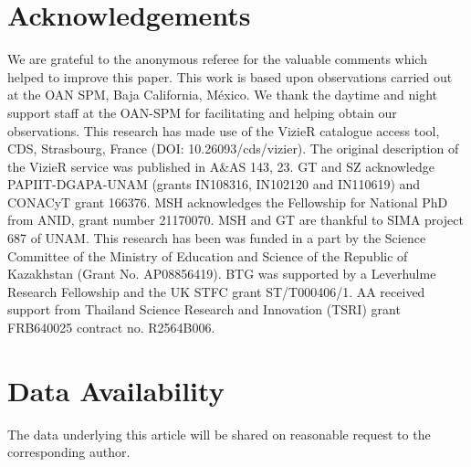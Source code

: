 \documentclass[fleqn,usenatbib]{mnras}
\begin{document}
\section*{Acknowledgements}

 We are grateful to the anonymous referee for the valuable comments which helped to improve this paper. This work is based upon observations carried out at the OAN SPM, Baja California, M\'{e}xico. We thank the daytime and night support staff at the OAN-SPM for facilitating and helping obtain our observations. This research has made use of the VizieR catalogue access tool, CDS, Strasbourg, France (DOI: 10.26093/cds/vizier). The original description of the VizieR service was published in A\&AS 143, 23.
GT and SZ acknowledge PAPIIT-DGAPA-UNAM (grants IN108316, IN102120 and IN110619) and CONACyT grant 166376.  MSH acknowledges the Fellowship for National PhD from ANID, grant number 21170070. MSH and GT are thankful to SIMA project 687 of UNAM.   This research has been was funded in a part by the Science Committee of the Ministry of Education and Science of the Republic of Kazakhstan (Grant No. AP08856419).
BTG was supported by a Leverhulme Research Fellowship and the UK STFC grant ST/T000406/1. AA received support from Thailand Science Research and Innovation (TSRI) grant FRB640025 contract no. R2564B006.

\section*{Data Availability}
The data underlying this article will be shared on reasonable request to the corresponding author.






 
\end{document}
